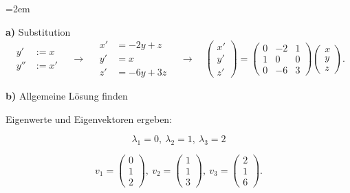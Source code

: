 \vspace{1\baselineskip}

\begin{solution}    

    \vspace{1\baselineskip}

    \leftskip=2em

    \textbf{a)} Substitution
    \begin{equation*}
        \begin{aligned}
            y' &:= x \\
            y'' &:= x' 
        \end{aligned} \quad \rightarrow \quad
        \begin{aligned}
            x' &= -2y + z \\
            y' &= x \\
            z' &= -6y + 3z
        \end{aligned} \quad \rightarrow \quad
        \begin{pmatrix}
            x' \\
            y' \\
            z'
        \end{pmatrix} =
        \begin{pmatrix}
            0 & -2 & 1 \\
            1 & 0 & 0 \\
            0 & -6 & 3
        \end{pmatrix}
        \begin{pmatrix}
            x \\
            y \\
            z
        \end{pmatrix}.
    \end{equation*}

    \textbf{b)} Allgemeine Lösung finden

    \vspace{1\baselineskip}

    Eigenwerte und Eigenvektoren ergeben:

    \begin{equation*}
        \lambda_1 = 0, \ \lambda_2 = 1, \ \lambda_3 = 2  
    \end{equation*}

    \begin{equation*}
        v_1 = \begin{pmatrix} 0 \\ 1 \\ 2 \end{pmatrix}, \ v_2 = \begin{pmatrix} 1 \\ 1 \\ 3 \end{pmatrix}, \ v_3 = \begin{pmatrix} 2 \\ 1 \\ 6 \end{pmatrix}.
    \end{equation*}


\end{solution}
